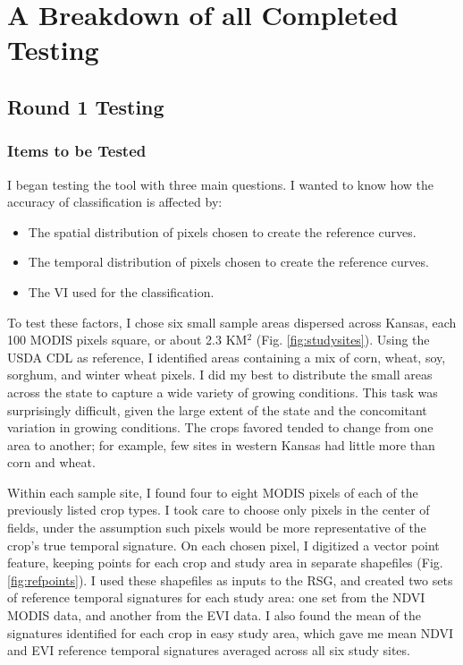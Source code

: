 \chapter{A Breakdown of all Completed Testing}

\section{Round 1 Testing}
\subsection*{Items to be Tested}

I began testing the tool with three main questions. I wanted to know how the accuracy of classification is affected by:

\begin{Spacing}{1.2}
\begin{itemize}
  \item The spatial distribution of pixels chosen to create the reference curves.
  \item The temporal distribution of pixels chosen to create the reference curves.
  \item The VI used for the classification.
\end{itemize}
\end{Spacing}

To test these factors, I chose six small sample areas dispersed across Kansas, each 100 MODIS pixels square, or about 2.3 KM$^2$ (Fig. \ref{fig:studysites}). Using the USDA CDL as reference, I identified areas containing a mix of corn, wheat, soy, sorghum, and winter wheat pixels. I did my best to distribute the small areas across the state to capture a wide variety of growing conditions. This task was surprisingly difficult, given the large extent of the state and the concomitant variation in growing conditions. The crops favored tended to change from one area to another; for example, few sites in western Kansas had little more than corn and wheat.

Within each sample site, I found four to eight MODIS pixels of each of the previously listed crop types. I took care to choose only pixels in the center of fields, under the assumption such pixels would be more representative of the crop’s true temporal signature. On each chosen pixel, I digitized a vector point feature, keeping points for each crop and study area in separate shapefiles  (Fig. \ref{fig:refpoints}). I used these shapefiles as inputs to the RSG, and created two sets of reference temporal signatures for each study area: one set from the NDVI MODIS data, and another from the EVI data. I also found the mean of the signatures identified for each crop in easy study area, which gave me mean NDVI and EVI reference temporal signatures averaged across all six study sites.

